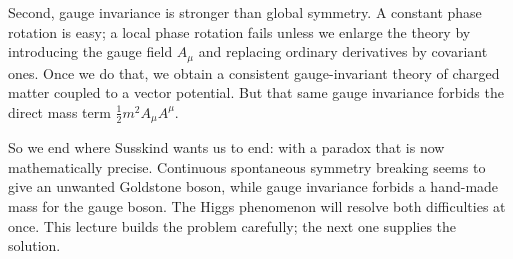 Second, gauge invariance is stronger than global symmetry. A constant phase rotation is easy; a local phase rotation fails unless we enlarge the theory by introducing the gauge field \(A_\mu\) and replacing ordinary derivatives by covariant ones. Once we do that, we obtain a consistent gauge-invariant theory of charged matter coupled to a vector potential. But that same gauge invariance forbids the direct mass term \(\tfrac12 m^2 A_\mu A^\mu\).

So we end where Susskind wants us to end: with a paradox that is now mathematically precise. Continuous spontaneous symmetry breaking seems to give an unwanted Goldstone boson, while gauge invariance forbids a hand-made mass for the gauge boson. The Higgs phenomenon will resolve both difficulties at once. This lecture builds the problem carefully; the next one supplies the solution.